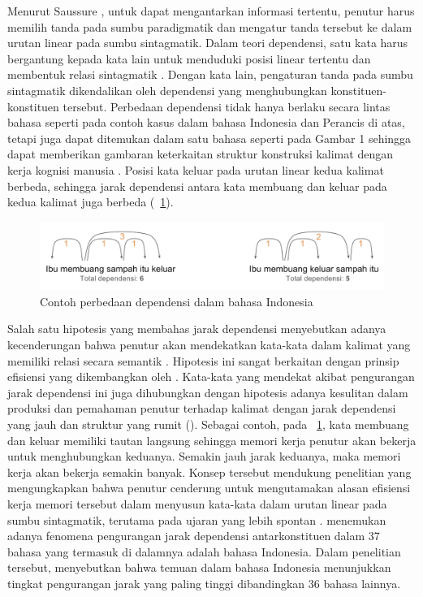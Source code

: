 Menurut Saussure \citep{key2017course}, untuk dapat mengantarkan informasi tertentu, penutur harus memilih tanda pada sumbu paradigmatik dan mengatur tanda tersebut ke dalam urutan linear pada sumbu sintagmatik. Dalam teori dependensi, satu kata harus bergantung kepada kata lain untuk menduduki posisi linear tertentu dan membentuk relasi sintagmatik \citep{tesniere1959elements}. Dengan kata lain, pengaturan tanda pada sumbu sintagmatik dikendalikan oleh dependensi yang menghubungkan konstituen-konstituen tersebut. Perbedaan dependensi tidak hanya berlaku secara lintas bahasa seperti pada contoh kasus dalam bahasa Indonesia dan Perancis di atas, tetapi juga dapat ditemukan dalam satu bahasa seperti pada Gambar 1 sehingga dapat memberikan gambaran keterkaitan struktur konstruksi kalimat dengan kerja kognisi manusia \citep{gibson2000dependency}. Posisi kata keluar pada urutan linear kedua kalimat berbeda, sehingga jarak dependensi antara kata membuang dan keluar pada kedua kalimat juga berbeda (\pic~\ref{fig:contoh-dependensi}). 
\begin{figure}
	\centering \includegraphics[width=1
	\textwidth] {pics/contoh-dependensi.png} \caption{Contoh perbedaan dependensi dalam bahasa Indonesia} 
\label{fig:contoh-dependensi} \end{figure}

Salah satu hipotesis yang membahas jarak dependensi menyebutkan adanya kecenderungan bahwa penutur akan mendekatkan kata-kata dalam kalimat yang memiliki relasi secara semantik \citep{futrell2015large}. Hipotesis ini sangat berkaitan dengan prinsip efisiensi yang dikembangkan oleh \cite{hawkins2004efficiency}. Kata-kata yang mendekat akibat pengurangan jarak dependensi ini juga dihubungkan dengan hipotesis adanya kesulitan dalam produksi dan pemahaman penutur terhadap kalimat dengan jarak dependensi yang jauh dan struktur yang rumit (\citealp{hawkins2004efficiency, dillon2011structured}). Sebagai contoh, pada \pic~\ref{fig:contoh-dependensi}, kata membuang dan keluar memiliki tautan langsung sehingga memori kerja penutur akan bekerja untuk menghubungkan keduanya. Semakin jauh jarak keduanya, maka memori kerja akan bekerja semakin banyak. Konsep tersebut mendukung penelitian \cite{jaeger2006redundancy} yang mengungkapkan bahwa penutur cenderung untuk mengutamakan alasan efisiensi kerja memori tersebut dalam menyusun kata-kata dalam urutan linear pada sumbu sintagmatik, terutama pada ujaran yang lebih spontan \citep{jaeger2006redundancy}. \cite{futrell2015large} menemukan adanya fenomena pengurangan jarak dependensi antarkonstituen dalam 37 bahasa yang termasuk di dalamnya adalah bahasa Indonesia. Dalam penelitian tersebut, \cite{futrell2015large} menyebutkan bahwa temuan dalam bahasa Indonesia menunjukkan tingkat pengurangan jarak yang paling tinggi dibandingkan 36 bahasa lainnya. 

